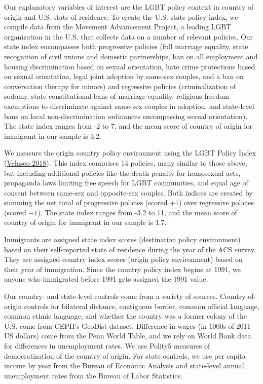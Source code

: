 \documentclass[
  11pt,
]{article}
\begin{document}
Our explanatory variables of interest are the LGBT policy context in country of origin and U.S. state of residence. To create the U.S. state policy index, we compile data from the Movement Advancement Project, a leading LGBT organization in the U.S. that collects data on a number of relevant policies. Our state index encompasses both progressive policies (full marriage equality, state recognition of civil unions and domestic partnerships, ban on all employment and housing discrimination based on sexual orientation, hate crime protections based on sexual orientation, legal joint adoption by same-sex couples, and a ban on conversation therapy for minors) and regressive policies (criminalization of sodomy, state constitutional bans of marriage equality, religious freedom exemptions to discriminate against same-sex couples in adoption, and state-level bans on local non-discrimination ordinances encompassing sexual orientation). The state index ranges from -2 to 7, and the mean score of country of origin for immigrant in our sample is 3.2.

We measure the origin country policy environment using the LGBT Policy Index (\protect\hyperlink{ref-velasco_2018}{Velasco 2018}). This index comprises 14 policies, many similar to those above, but including additional policies like the death penalty for homosexual acts, propaganda laws limiting free speech for LGBT communities, and equal age of consent between same-sex and opposite-sex couples. Both indices are created by summing the net total of progressive policies (scored \(+1\)) over regressive policies (scored \(-1\)). The state index ranges from -3.2 to 11, and the mean score of country of origin for immigrant in our sample is 1.7.

Immigrants are assigned state index scores (destination policy environment) based on their self-reported state of residence during the year of the ACS survey. They are assigned country index scores (origin policy environment) based on their year of immigration. Since the country policy index begins at 1991, we anyone who immigrated before 1991 gets assigned the 1991 value.

Our country- and state-level controls come from a variety of sources. Country-of-origin controls for bilateral distance, contiguous border, common official language, common ethnic language, and whether the country was a former colony of the U.S. come from CEPII's GeoDist dataset. Difference in wages (in 1000s of 2011 US dollars) come from the Penn World Table, and we rely on World Bank data for differences in unemployment rates. We use Polity5 measures of democratization of the country of origin. For state controls, we use per capita income by year from the Bureau of Economic Analysis and state-level annual unemployment rates from the Bureau of Labor Statistics.
\end{document}
